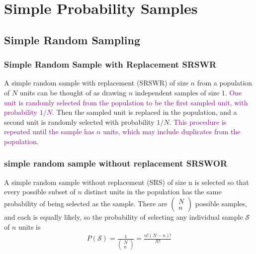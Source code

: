 \documentclass[a4paper,twoside,11pt]{article}
\begin{document}
\section{Simple Probability Samples}
\subsection{Simple Random Sampling}
\subsubsection{Simple Random Sample with Replacement SRSWR}
A simple random sample with replacement (SRSWR) of size $n$ from a population of $N$ units can be thought of as drawing $n$ independent samples of size $1$. \textcolor{Purple}{One unit is randomly selected from the population to be the first sampled unit, with probability $1/N$.} Then the sampled unit is replaced in the population, and a second unit is randomly selected with probability $1/N$. \textcolor{Purple}{This procedure is repeated until the sample has $n$ units, which may include duplicates from the population.}
\subsubsection{simple random sample without replacement SRSWOR}
A simple random sample without replacement (SRS) of size n is selected so that every possible subset of $n$ distinct units in the population has the same probability of being selected as the sample. There are $\begin{pmatrix} N \\ n \end{pmatrix}$ possible samples, and each is equally likely, so the probability of selecting any individual sample $\mathcal{S}$ of $n$ units is
\begin{equation*}
\begin{aligned}
P(\mathcal{S}) = \frac{1}{\begin{pmatrix} N \\ n \end{pmatrix} } = \frac{n!(N-n)!}{N!}
\end{aligned}
\end{equation*}
\end{document}
